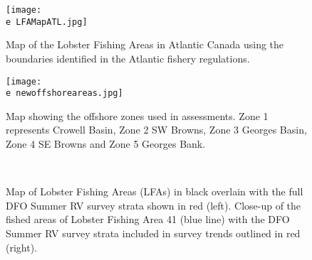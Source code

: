 \documentclass[11pt]{article}
\newcommand{\D}{.}
\newcommand{\e}{/backup/bio_data/bio.lobster/figures/} %
\begin{document}
\begin{landscape}
\begin{figure}
\centering
    \texttt{[image: \\e LFAMapATL.jpg]}
    \caption{Map of the Lobster Fishing Areas in Atlantic Canada using the boundaries identified in the Atlantic fishery regulations.}

\end{figure}
\end{landscape}



\begin{figure}
\centering
    \texttt{[image: \\e newoffshoreareas.jpg]}
    \caption{Map showing the offshore zones used in assessments. Zone 1 represents Crowell Basin, Zone 2 SW Browns, Zone 3 Georges Basin, Zone 4 SE Browns and Zone 5 Georges Bank. 
}

\end{figure}

\begin{landscape}

\begin{figure}
\centering
{}
\\
\caption{ Map of Lobster Fishing Areas (LFAs) in black overlain with the full DFO Summer RV survey strata shown in red (left). Close-up of the fished areas of Lobster Fishing Area 41 (blue line) with the DFO Summer RV survey strata included in survey trends outlined in red (right).}
\end{figure}

\end{landscape}
\end{document}

